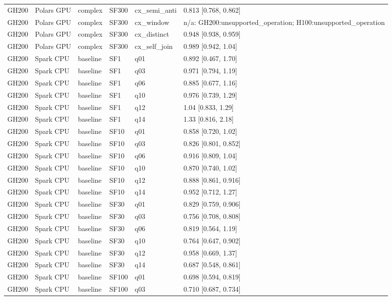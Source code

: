 \begin{longtable}{llllll}
GH200 & Polars GPU & complex & SF300 & cx\_semi\_anti & 0.813 [0.768, 0.862] \\
GH200 & Polars GPU & complex & SF300 & cx\_window & n/a: GH200:unsupported\_operation; H100:unsupported\_operation \\
GH200 & Polars GPU & complex & SF300 & cx\_distinct & 0.948 [0.938, 0.959] \\
GH200 & Polars GPU & complex & SF300 & cx\_self\_join & 0.989 [0.942, 1.04] \\
GH200 & Spark CPU & baseline & SF1 & q01 & 0.892 [0.467, 1.70] \\
GH200 & Spark CPU & baseline & SF1 & q03 & 0.971 [0.794, 1.19] \\
GH200 & Spark CPU & baseline & SF1 & q06 & 0.885 [0.677, 1.16] \\
GH200 & Spark CPU & baseline & SF1 & q10 & 0.976 [0.739, 1.29] \\
GH200 & Spark CPU & baseline & SF1 & q12 & 1.04 [0.833, 1.29] \\
GH200 & Spark CPU & baseline & SF1 & q14 & 1.33 [0.816, 2.18] \\
GH200 & Spark CPU & baseline & SF10 & q01 & 0.858 [0.720, 1.02] \\
GH200 & Spark CPU & baseline & SF10 & q03 & 0.826 [0.801, 0.852] \\
GH200 & Spark CPU & baseline & SF10 & q06 & 0.916 [0.809, 1.04] \\
GH200 & Spark CPU & baseline & SF10 & q10 & 0.870 [0.740, 1.02] \\
GH200 & Spark CPU & baseline & SF10 & q12 & 0.888 [0.861, 0.916] \\
GH200 & Spark CPU & baseline & SF10 & q14 & 0.952 [0.712, 1.27] \\
GH200 & Spark CPU & baseline & SF30 & q01 & 0.829 [0.759, 0.906] \\
GH200 & Spark CPU & baseline & SF30 & q03 & 0.756 [0.708, 0.808] \\
GH200 & Spark CPU & baseline & SF30 & q06 & 0.819 [0.564, 1.19] \\
GH200 & Spark CPU & baseline & SF30 & q10 & 0.764 [0.647, 0.902] \\
GH200 & Spark CPU & baseline & SF30 & q12 & 0.958 [0.669, 1.37] \\
GH200 & Spark CPU & baseline & SF30 & q14 & 0.687 [0.548, 0.861] \\
GH200 & Spark CPU & baseline & SF100 & q01 & 0.698 [0.594, 0.819] \\
GH200 & Spark CPU & baseline & SF100 & q03 & 0.710 [0.687, 0.734] \\

\end{longtable}
